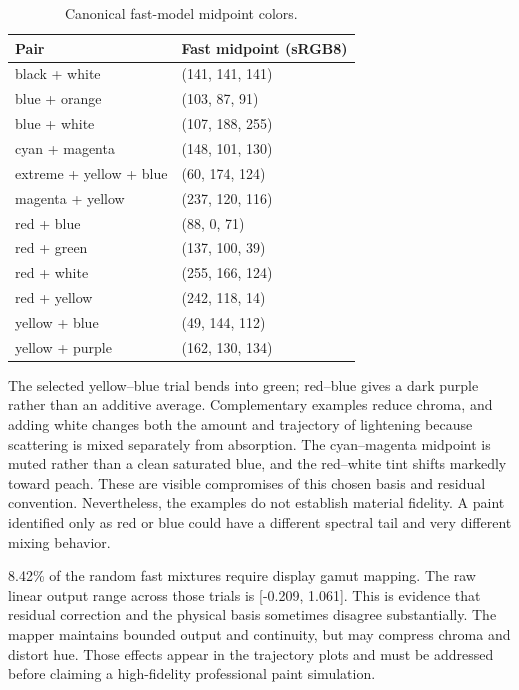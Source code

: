 \documentclass[
  10pt,
  twocolumn]{article}
\begin{document}
\begin{table}[t]
\caption{Canonical fast-model midpoint colors.}
\centering\small
\begin{tabular}{@{}ll@{}}
\toprule\noalign{}
Pair & Fast midpoint (sRGB8) \\
\midrule\noalign{}

\bottomrule\noalign{}

black + white & (141, 141, 141) \\
blue + orange & (103, 87, 91) \\
blue + white & (107, 188, 255) \\
cyan + magenta & (148, 101, 130) \\
extreme + yellow + blue & (60, 174, 124) \\
magenta + yellow & (237, 120, 116) \\
red + blue & (88, 0, 71) \\
red + green & (137, 100, 39) \\
red + white & (255, 166, 124) \\
red + yellow & (242, 118, 14) \\
yellow + blue & (49, 144, 112) \\
yellow + purple & (162, 130, 134) \\
\end{tabular}
\end{table}

The selected yellow--blue trial bends into green; red--blue gives a dark
purple rather than an additive average. Complementary examples reduce
chroma, and adding white changes both the amount and trajectory of
lightening because scattering is mixed separately from absorption. The
cyan--magenta midpoint is muted rather than a clean saturated blue, and
the red--white tint shifts markedly toward peach. These are visible
compromises of this chosen basis and residual convention. Nevertheless,
the examples do not establish material fidelity. A paint identified only
as red or blue could have a different spectral tail and very different
mixing behavior.

8.42\% of the random fast mixtures require display gamut mapping. The
raw linear output range across those trials is {[}-0.209, 1.061{]}. This
is evidence that residual correction and the physical basis sometimes
disagree substantially. The mapper maintains bounded output and
continuity, but may compress chroma and distort hue. Those effects
appear in the trajectory plots and must be addressed before claiming a
high-fidelity professional paint simulation.
\end{document}

